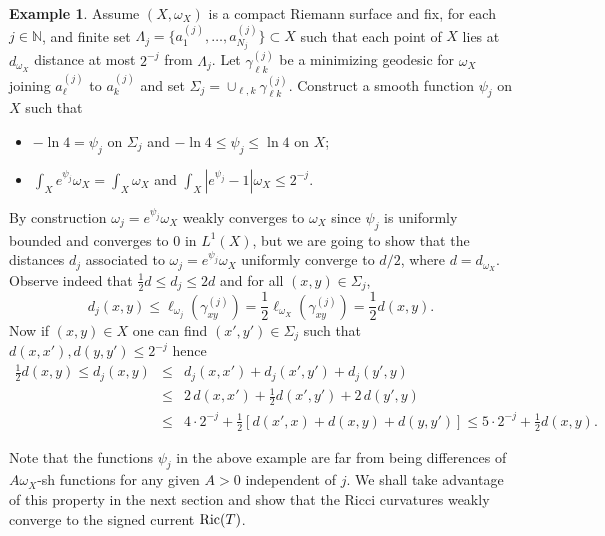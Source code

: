 \documentclass[a4paper,11pt,leqno,english]{smfart}
\theoremstyle{plain}
\theoremstyle{plain}
\numberwithin{equation}{section} %
\numberwithin{figure}{section} %
\theoremstyle{plain}
\theoremstyle{plain}
\theoremstyle{remark}
\theoremstyle{remark}
\theoremstyle{definition}
\newtheorem{exa}[thm]{Example}
\theoremstyle{plain}
\theoremstyle{plain}
\theoremstyle{definition}
\newcommand{\N}{{\mathbb{N}}}
\newcommand{\p}{\psi}
\begin{document}
\begin{exa}
Assume $(X,\omega_X)$ is a compact Riemann surface and fix, for each $j \in \N$, and finite set 
$\Lambda_j=\{a_1^{(j)},\ldots,a_{N_j}^{(j)} \} \subset X$ such that each point of $X$ lies at $d_{\omega_X}$ distance
at most $2^{-j}$ from $\Lambda_j$. Let $\gamma_{\ell k}^{(j)}$ be a minimizing geodesic for $\omega_X$ joining
$a_{\ell}^{(j)}$ to $a_k^{(j)}$ and set $\Sigma_j=\cup_{\ell,k} \gamma_{\ell k}^{(j)}$.
Construct a smooth function $\p_j$ on $X$ such that
\begin{itemize}
\item[$\bullet$] $-\ln 4=\p_j$ on $\Sigma_j$ and $-\ln 4 \leq \p_j \leq  \ln 4$ on $X$;
\item[$\bullet$] $\int_X e^{\p_j} \omega_X=\int_X \omega_X$ and $\int_X \left|e^{\p_j}-1 \right| \omega_X \leq 2^{-j}$.
\end{itemize}

By construction $\omega_j =e^{\p_j} \omega_X$ weakly converges to $\omega_X$ since 
$\p_j$ is uniformly bounded and converges to $0$ in $L^1(X)$, but we are going
to show that the distances $d_j$  associated to $\omega_j =e^{\p_j} \omega_X$ 
uniformly converge to $d/2$, where $d=d_{\omega_X}$.
Observe indeed that $\frac{1}{2} d \leq d_j \leq 2 d$
and for all $(x,y) \in \Sigma_j$,
$$
d_j(x,y) \leq \ell_{\omega_j}(\gamma_{x y}^{(j)})=\frac{1}{2} \ell_{\omega_X}(\gamma_{x y}^{(j)})=\frac{1}{2}d(x,y).
$$
Now if $(x,y) \in X$ one can find  $(x',y') \in \Sigma_j$ such that 
$d(x,x'), d(y,y') \leq 2^{-j}$ hence
\begin{eqnarray*}
\frac{1}{2} d(x,y) \leq d_j(x,y) & \leq &  d_j(x,x')+d_j(x',y')+d_j(y',y) \\
& \leq & 2 \,d(x,x')+\frac{1}{2} d(x',y')+ 2\,d(y',y) \\
& \leq & 4 \cdot2^{-j}+\frac{1}{2} \left[ d(x',x)+d(x,y)+d(y,y') \right] 
 \leq  5 \cdot 2^{-j}+\frac{1}{2} d(x,y).
\end{eqnarray*}
\end{exa}

Note that the functions $\p_j$ in the above example are far from being differences of $A\omega_X$-sh functions for any given $A>0$ independent of $j$.
We shall take advantage of this property in the next section and show that the
Ricci curvatures weakly converge to the signed current ${\rm Ric}(T)$.
\end{document}
